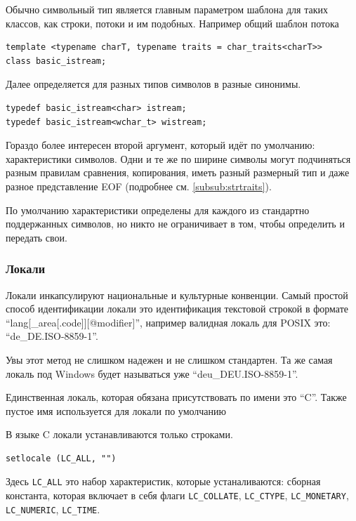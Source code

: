 \documentclass[a4paper,12pt,oneside]{article}
\begin{document}
Обычно символьный тип является главным параметром шаблона для таких классов, как строки, потоки и им подобных. Например общий шаблон потока

\begin{lstlisting}
template <typename charT, typename traits = char_traits<charT>>
class basic_istream;
\end{lstlisting}

Далее определяется для разных типов символов в разные синонимы.

\begin{lstlisting}
typedef basic_istream<char> istream;
typedef basic_istream<wchar_t> wistream;
\end{lstlisting}

Гораздо более интересен второй аргумент, который идёт по умолчанию: характеристики символов. Одни и те же по ширине символы могут подчиняться разным правилам сравнения, копирования, иметь разный размерный тип и даже разное представление EOF (подробнее см. \ref{subsub:strtraits}).

По умолчанию характеристики определены для каждого из стандартно поддержанных символов, но никто не ограничивает в том, чтобы определить и передать свои.

\subsubsection{Локали}\label{subsubsec:locales}

Локали инкапсулируют национальные и культурные конвенции. Самый простой способ идентификации локали это идентификация текстовой строкой в формате ``lang[\_area[.code]][@modifier]'', например валидная локаль для POSIX это: ``de\_DE.ISO-8859-1''.

Увы этот метод не слишком надежен и не слишком стандартен. Та же самая локаль под Windows будет называться уже ``deu\_DEU.ISO-8859-1''.

Единственная локаль, которая обязана присутствовать по имени это ``C''. Также пустое имя используется для локали по умолчанию

В языке C локали устанавливаются только строками.

\begin{lstlisting}
setlocale (LC_ALL, "")
\end{lstlisting}

Здесь \lstinline!LC_ALL! это набор характеристик, которые устаналиваются: сборная константа, которая включает в себя флаги \lstinline!LC_COLLATE!, \lstinline!LC_CTYPE!, \lstinline!LC_MONETARY!, \lstinline!LC_NUMERIC!, \lstinline!LC_TIME!.
\end{document}
